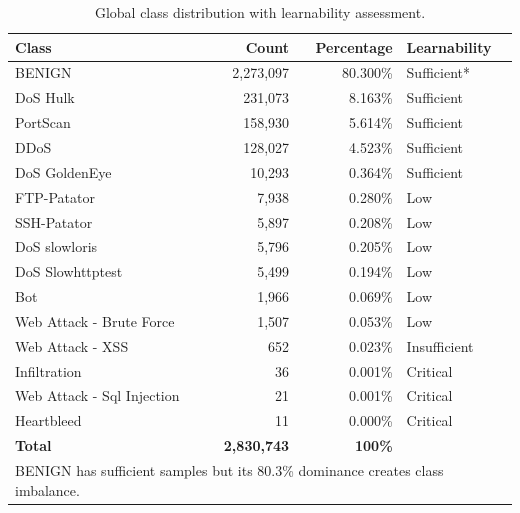 \documentclass[12pt,a4paper]{article}
\begin{document}
\begin{table}[H]
    \centering
    \caption{Global class distribution with learnability assessment.}
    \label{tab:class_distribution}
    \begin{tabular}{|l|r|r|l|}
        \hline
        \textbf{Class}             & \textbf{Count}     & \textbf{Percentage} & \textbf{Learnability} \\
        \hline
        BENIGN                     & 2,273,097          & 80.300\%            & Sufficient*           \\
        \hline
        DoS Hulk                   & 231,073            & 8.163\%             & Sufficient            \\
        \hline
        PortScan                   & 158,930            & 5.614\%             & Sufficient            \\
        \hline
        DDoS                       & 128,027            & 4.523\%             & Sufficient            \\
        \hline
        DoS GoldenEye              & 10,293             & 0.364\%             & Sufficient            \\
        \hline
        FTP-Patator                & 7,938              & 0.280\%             & Low                   \\
        \hline
        SSH-Patator                & 5,897              & 0.208\%             & Low                   \\
        \hline
        DoS slowloris              & 5,796              & 0.205\%             & Low                   \\
        \hline
        DoS Slowhttptest           & 5,499              & 0.194\%             & Low                   \\
        \hline
        Bot                        & 1,966              & 0.069\%             & Low                   \\
        \hline
        Web Attack - Brute Force   & 1,507              & 0.053\%             & Low                   \\
        \hline
        Web Attack - XSS           & 652                & 0.023\%             & Insufficient          \\
        \hline
        Infiltration               & 36                 & 0.001\%             & Critical              \\
        \hline
        Web Attack - Sql Injection & 21                 & 0.001\%             & Critical              \\
        \hline
        Heartbleed                 & 11                 & 0.000\%             & Critical              \\
        \hline
        \textbf{Total}             & \textbf{2,830,743} & \textbf{100\%}      &                       \\
        \hline
        \multicolumn{4}{|l|}{\small * BENIGN has sufficient samples but its 80.3\% dominance
        creates class imbalance.}                                                                     \\
        \hline
    \end{tabular}
\end{table}
\end{document}

